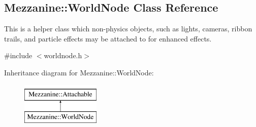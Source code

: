 \hypertarget{classMezzanine_1_1WorldNode}{
\subsection{Mezzanine::WorldNode Class Reference}
\label{classMezzanine_1_1WorldNode}
}


This is a helper class which non-\/physics objects, such as lights, cameras, ribbon trails, and particle effects may be attached to for enhanced effects.  




{\ttfamily \#include $<$worldnode.h$>$}

Inheritance diagram for Mezzanine::WorldNode:\begin{figure}[H]
\begin{center}
\leavevmode
\includegraphics[height=2.000000cm]{classMezzanine_1_1WorldNode}
\end{center}
\end{figure}
